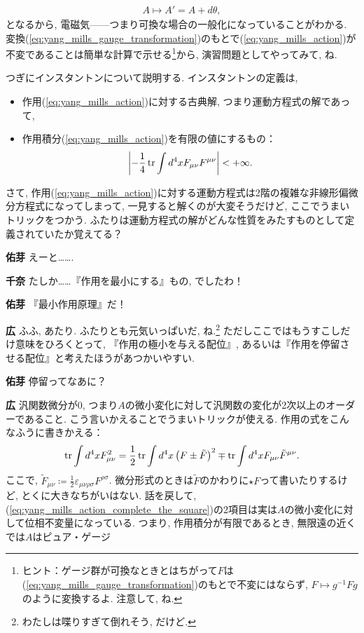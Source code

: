 \documentclass{ltjsarticle}
\theoremstyle{definition}
\newcommand{\parno}{\par\noindent}
\begin{document}
\begin{align}
  A\mapsto A'=A+d\theta,
\end{align}
となるから, 電磁気------つまり可換な場合の一般化になっていることがわかる. 変換(\ref{eq:yang_mills_gauge_transformation})のもとで(\ref{eq:yang_mills_action})が不変であることは簡単な計算で示せる\footnote{ヒント：ゲージ群が可換なときとはちがって$F$は(\ref{eq:yang_mills_gauge_transformation})のもとで不変にはならず, $F\mapsto g^{-1}Fg$のように変換するよ. 注意して, ね.}から, 演習問題としてやってみて, ね.\par
つぎにインスタントンについて説明する. インスタントンの定義は,
\begin{itemize}
  \item 作用(\ref{eq:yang_mills_action})に対する古典解, つまり運動方程式の解であって,
  \item 作用積分(\ref{eq:yang_mills_action})を有限の値にするもの：
  \begin{gather}
    \left|-\frac14\tr\int d^4xF_{\mu\nu}F^{\mu\nu}\right|<+\infty.
  \end{gather}
\end{itemize}
さて, 作用(\ref{eq:yang_mills_action})に対する運動方程式は2階の複雑な非線形偏微分方程式になってしまって, 一見すると解くのが大変そうだけど, ここでうまいトリックをつかう. ふたりは運動方程式の解がどんな性質をみたすものとして定義されていたか覚えてる？\parno
\textbf{佑芽} えーと…….\parno
\textbf{千奈} たしか……『作用を最小にする』もの, でしたわ！\parno
\textbf{佑芽} 『最小作用原理』だ！\parno
\textbf{広} ふふ, あたり. ふたりとも元気いっぱいだ, ね.\footnote{わたしは喋りすぎて倒れそう, だけど.} ただしここではもうすこしだけ意味をひろくとって, 『作用の極小を与える配位』, あるいは『作用を停留させる配位』と考えたほうがあつかいやすい.\parno
\textbf{佑芽} 停留ってなあに？\parno
\textbf{広} 汎関数微分が0, つまり$A$の微小変化に対して汎関数の変化が2次以上のオーダーであること. こう言いかえることでうまいトリックが使える. 作用の式をこんなふうに書きかえる：
\begin{gather}
  \tr\int d^4xF_{\mu\nu}^2=\frac12\tr\int d^4x\left(F\pm\tilde F\right)^2\mp\tr\int d^4xF_{\mu\nu}\tilde F^{\mu\nu}.\label{eq:yang_mills_action_complete_the_square}
\end{gather}
ここで, $\tilde F_{\mu\nu}\coloneqq\displaystyle\frac12\varepsilon_{\mu\nu\rho\sigma}F^{\rho\sigma}$. 微分形式のときは$\tilde F$のかわりに$\star F$って書いたりするけど, とくに大きなちがいはない. 話を戻して, (\ref{eq:yang_mills_action_complete_the_square})の2項目は実は$A$の微小変化に対して位相不変量になっている. つまり, 作用積分が有限であるとき, 無限遠の近くでは$A$はピュア・ゲージ
\end{document}
